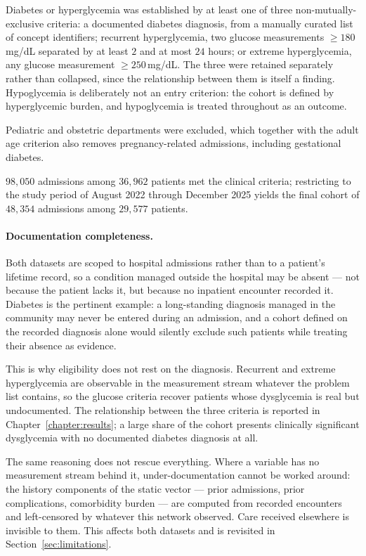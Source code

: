 Diabetes or hyperglycemia was established by at least one of three non-mutually-exclusive criteria: a documented diabetes diagnosis, from a manually curated list of concept identifiers; recurrent hyperglycemia, two glucose measurements $\ge 180$\,mg/dL separated by at least $2$ and at most $24$ hours; or extreme hyperglycemia, any glucose measurement $\ge 250$\,mg/dL. The three were retained separately rather than collapsed, since the relationship between them is itself a finding. Hypoglycemia is deliberately not an entry criterion: the cohort is defined by hyperglycemic burden, and hypoglycemia is treated throughout as an outcome.

Pediatric and obstetric departments were excluded, which together with the adult age criterion also removes pregnancy-related admissions, including gestational diabetes.

$98{,}050$ admissions among $36{,}962$ patients met the clinical criteria; restricting to the study period of August 2022 through December 2025 yields the final cohort of $48{,}354$ admissions among $29{,}577$ patients.

\paragraph{Documentation completeness.}
Both datasets are scoped to hospital admissions rather than to a patient's lifetime record, so a condition managed outside the hospital may be absent --- not because the patient lacks it, but because no inpatient encounter recorded it. Diabetes is the pertinent example: a long-standing diagnosis managed in the community may never be entered during an admission, and a cohort defined on the recorded diagnosis alone would silently exclude such patients while treating their absence as evidence.

This is why eligibility does not rest on the diagnosis. Recurrent and extreme hyperglycemia are observable in the measurement stream whatever the problem list contains, so the glucose criteria recover patients whose dysglycemia is real but undocumented. The relationship between the three criteria is reported in Chapter~\ref{chapter:results}; a large share of the cohort presents clinically significant dysglycemia with no documented diabetes diagnosis at all.

The same reasoning does not rescue everything. Where a variable has no measurement stream behind it, under-documentation cannot be worked around: the history components of the static vector --- prior admissions, prior complications, comorbidity burden --- are computed from recorded encounters and left-censored by whatever this network observed. Care received elsewhere is invisible to them. This affects both datasets and is revisited in Section~\ref{sec:limitations}.


